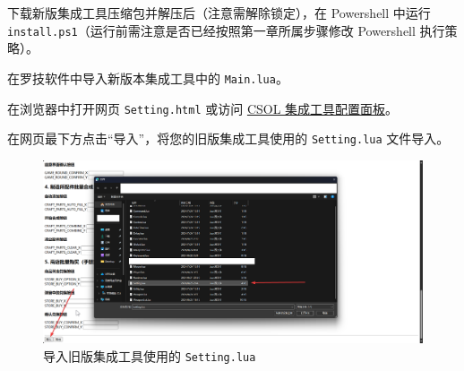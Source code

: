 






下载新版集成工具压缩包并解压后（注意需解除锁定），在 Powershell 中运行 \lstinline{install.ps1}（运行前需注意是否已经按照第一章所属步骤修改 Powershell 执行策略）。

在罗技软件中导入新版本集成工具中的 \lstinline{Main.lua}。

在浏览器中打开网页 \lstinline{Setting.html} 或访问 \href{https://macrohard.fun/CSOL-Utilities/Setting.html}{CSOL 集成工具配置面板}。

在网页最下方点击“导入”，将您的旧版集成工具使用的 \lstinline{Setting.lua} 文件导入。

\begin{figure}[H]
    \Centering
    \includegraphics[width=\textwidth]{docs/assets/update/import_setting}
    \caption{导入旧版集成工具使用的 \lstinline{Setting.lua}}
\end{figure}

